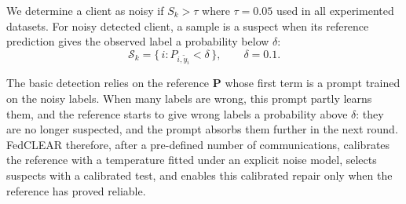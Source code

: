 \documentclass[runningheads]{llncs}
\begin{document}
We determine a client as noisy if $S_k > \tau$ where $\tau = 0.05$ used in all experimented datasets. For noisy detected client, a sample is a suspect when its reference prediction gives the observed
label a probability below $\delta$:
\begin{equation}
\mathcal{S}_k = \{\, i : P_{i,\tilde{y}_i} < \delta \,\}, \qquad \delta = 0.1 .
\label{eq:suspect}
\end{equation}


The basic detection relies on the reference $\mathbf{P}$ whose first term is a
prompt trained on the noisy labels. When many labels are wrong, this prompt partly learns them, and
the reference starts to give wrong labels a probability above $\delta$: they are no longer suspected,
and the prompt absorbs them further in the next round. FedCLEAR therefore, after a pre-defined number of communications,  calibrates the reference
with a temperature fitted under an explicit noise model, selects suspects with a calibrated test,
and enables this calibrated repair only when the reference has proved reliable.
\end{document}
